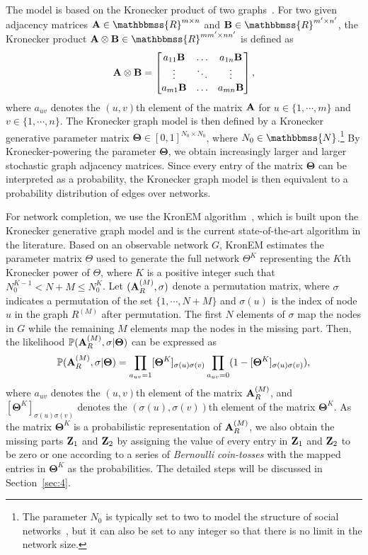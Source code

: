 \documentclass[format=acmsmall, review=false, screen=true]{acmart}
\newcommand{\N}{\mathbbmss{N}}
\newcommand{\R}{\mathbbmss{R}}
\begin{document}
The model is based on the Kronecker product of two graphs~\cite{kronproduct}. For two given adjacency matrices ${\bf A} \in \R^{m \times n}$ and ${\bf B} \in \R^{m' \times n'}$, the Kronecker product ${\bf A} \otimes {\bf B} \in \R^{mm' \times nn'}$ is defined as
\[
{\bf A} \otimes {\bf B}=
  \begin{bmatrix}
    a_{11}{\bf B}  & \dots & a_{1n}{\bf B}\\
    \vdots & \ddots & \vdots\\
    a_{m1}{\bf B} & \dots & a_{mn}{\bf B}
  \end{bmatrix},
\]
where $a_{uv}$ denotes the $(u,v)$th element of the matrix ${\bf A}$ for $u\in\{1,\cdots,m\}$ and $v\in\{1,\cdots,n\}$.
The Kronecker graph model is then defined by a Kronecker generative parameter matrix $\bm{\Theta} \in [0,1]^{N_0 \times N_0}$, where $N_0 \in \N$.\footnote{The parameter $N_0$ is typically set to two to model the structure of social networks~\cite{kronmodel}, but it can also be set to any integer so that there is no limit in the network size.} By Kronecker-powering the parameter $\bm{\Theta}$, we obtain increasingly larger and larger stochastic graph adjacency matrices. Since every entry of the matrix $\bm{\Theta}$ can be interpreted as a probability, the Kronecker graph model is then equivalent to a probability distribution of edges over networks.

For network completion, we use the KronEM algorithm~\cite{kronem}, which is built upon the Kronecker generative graph model and is the current state-of-the-art algorithm in the literature. Based on an observable network $G$, KronEM estimates the parameter matrix $\Theta$ used to generate the full network $\Theta^K$ representing the $K$th Kronecker power of $\Theta$, where $K$ is a positive integer such that $N_0^{K-1}<N+M\le N_0^K$. Let $({\bf A}_R^{(M)},\sigma)$ denote a permutation matrix, where $\sigma$ indicates a permutation of the set $\{1,\cdots,N+M\}$ and $\sigma(u)$ is the index of node $u$ in the graph $R^{(M)}$ after permutation. The first $N$ elements of $\sigma$ map the nodes in $G$ while the remaining $M$ elements map the nodes in the missing part. Then, the likelihood $\mathbb{P}({\bf A}_R^{(M)},\sigma|\bm{\Theta})$ can be expressed as
\begin{equation}\label{eq:2}
\mathbb{P}({\bf A}_R^{(M)},\sigma|\bm{\Theta}) = \displaystyle\prod_{a_{uv} =1}[\bm{\Theta}^K]_{\sigma(u)\sigma(v)} \displaystyle\prod_{a_{uv} = 0}(1-[\bm{\Theta}^K]_{\sigma(u)\sigma(v)}), \nonumber
\end{equation}
where $a_{uv}$ denotes the $(u,v)$th element of the matrix ${\bf{A}}_R^{(M)}$, and $[\bm{\Theta}^K]_{\sigma(u)\sigma(v)}$ denotes the $(\sigma(u),\sigma(v))$th element of the matrix $\bm{\Theta}^K$. 
As the matrix $\bm{\Theta}^K$ is a probabilistic representation of ${\bf A}_R^{(M)}$, we also obtain the  missing parts ${\bf Z}_1$ and ${\bf Z}_2$ by assigning the value of every entry in ${\bf Z}_1$ and ${\bf Z}_2$ to be zero or one according to a series of {\em Bernoulli coin-tosses} with the mapped entries in $\bm{\Theta}^K$ as the probabilities. The detailed steps will be discussed in Section~\ref{sec:4}.
\end{document}
